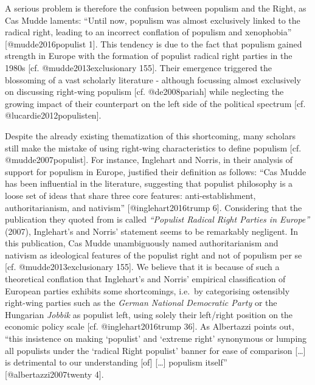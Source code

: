 \documentclass[]{article}
\begin{document}
A serious problem is therefore the confusion between populism and the
Right, as Cas Mudde laments: ``Until now, populism was almost
exclusively linked to the radical right, leading to an incorrect
conflation of populism and xenophobia'' {[}@mudde2016populist 1{]}. This
tendency is due to the fact that populism gained strength in Europe with
the formation of populist radical right parties in the 1980s {[}cf.
@mudde2013exclusionary 155{]}. Their emergence triggered the blossoming
of a vast scholarly literature - although focussing almost exclusively
on discussing right-wing populism {[}cf. @de2008pariah{]} while
neglecting the growing impact of their counterpart on the left side of
the political spectrum {[}cf. @lucardie2012populisten{]}.

Despite the already existing thematization of this shortcoming, many
scholars still make the mistake of using right-wing characteristics to
define populism {[}cf. @mudde2007populist{]}. For instance, Inglehart
and Norris, in their analysis of support for populism in Europe,
justified their definition as follows: ``Cas Mudde has been influential
in the literature, suggesting that populist philosophy is a loose set of
ideas that share three core features: anti-establishment,
authoritarianism, and nativism'' {[}@inglehart2016trump 6{]}.
Considering that the publication they quoted from is called
\emph{``Populist Radical Right Parties in Europe''} (2007), Inglehart's
and Norris' statement seems to be remarkably negligent. In this
publication, Cas Mudde unambiguously named authoritarianism and nativism
as ideological features of the populist right and not of populism per se
{[}cf. @mudde2013exclusionary 155{]}. We believe that it is because of
such a theoretical conflation that Inglehart's and Norris' empirical
classification of European parties exhibits some shortcomings, i.e.~by
categorising ostensibly right-wing parties such as the \emph{German
National Democratic Party} or the Hungarian \emph{Jobbik} as populist
left, using solely their left/right position on the economic policy
scale {[}cf. @inglehart2016trump 36{]}. As Albertazzi points out, ``this
insistence on making `populist' and `extreme right' synonymous or
lumping all populists under the `radical Right populist' banner for ease
of comparison {[}\ldots{}{]} is detrimental to our understanding
{[}of{]} {[}\ldots{}{]} populism itself'' {[}@albertazzi2007twenty 4{]}.
\end{document}
